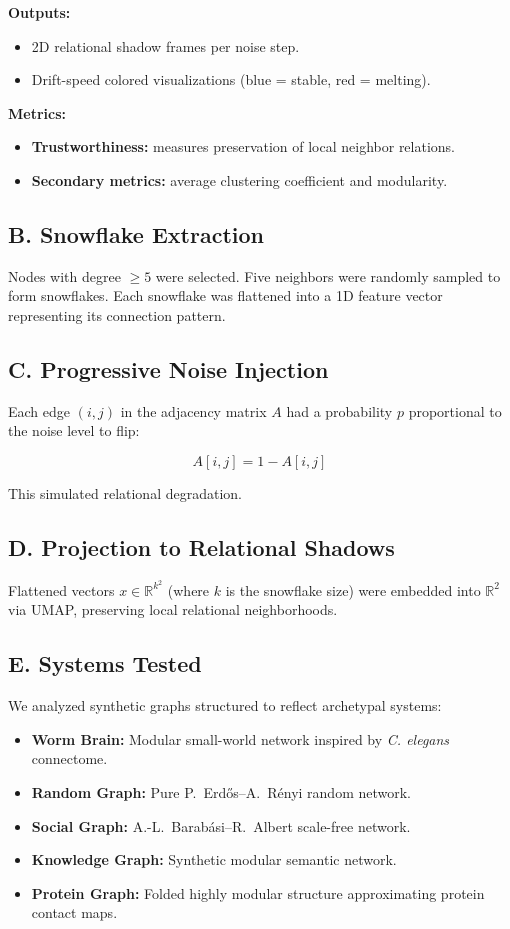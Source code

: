 \documentclass[conference]{IEEEtran}
\begin{document}
\textbf{Outputs:}
\begin{itemize}
    \item 2D relational shadow frames per noise step.
    \item Drift-speed colored visualizations (blue = stable, red = melting).
\end{itemize}

\textbf{Metrics:}
\begin{itemize}
    \item \textbf{Trustworthiness:} measures preservation of local neighbor relations.
    \item \textbf{Secondary metrics:} average clustering coefficient and modularity.
\end{itemize}
\subsection*{\textbf{B. Snowflake Extraction}}
Nodes with degree $\geq 5$ were selected. Five neighbors were randomly sampled to form snowflakes. Each snowflake was flattened into a 1D feature vector representing its connection pattern.

\subsection*{\textbf{C. Progressive Noise Injection}}
Each edge $(i, j)$ in the adjacency matrix $A$ had a probability $p$ proportional to the noise level to flip:

\[
A[i, j] = 1 - A[i, j]
\]

This simulated relational degradation.

\subsection*{\textbf{D. Projection to Relational Shadows}}
Flattened vectors $x \in \mathbb{R}^{k^2}$ (where $k$ is the snowflake size) were embedded into $\mathbb{R}^{2}$ via UMAP, preserving local relational neighborhoods.

\subsection*{\textbf{E. Systems Tested}}
We analyzed synthetic graphs structured to reflect archetypal systems:

\begin{itemize}
    \item \textbf{Worm Brain:} Modular small-world network inspired by \textit{C. elegans} connectome.
    \item \textbf{Random Graph:} Pure P.~Erd\H{o}s--A.~R\'enyi random network.
    \item \textbf{Social Graph:} A.-L.~Barab\'asi--R.~Albert scale-free network.
    \item \textbf{Knowledge Graph:} Synthetic modular semantic network.
    \item \textbf{Protein Graph:} Folded highly modular structure approximating protein contact maps.
\end{itemize}
\end{document}
